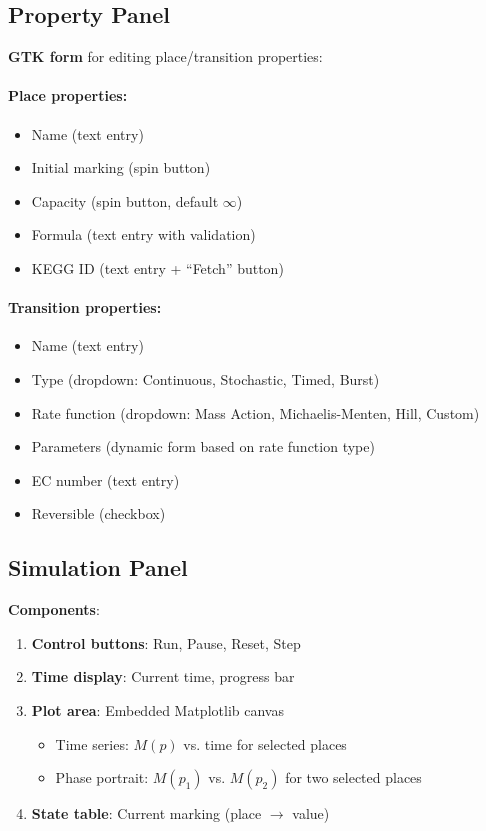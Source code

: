 \subsection{Property Panel}
\label{subsec:property-panel}

\textbf{GTK form} for editing place/transition properties:

\paragraph{Place properties:}
\begin{itemize}
    \item Name (text entry)
    \item Initial marking (spin button)
    \item Capacity (spin button, default $\infty$)
    \item Formula (text entry with validation)
    \item KEGG ID (text entry + ``Fetch'' button)
\end{itemize}

\paragraph{Transition properties:}
\begin{itemize}
    \item Name (text entry)
    \item Type (dropdown: Continuous, Stochastic, Timed, Burst)
    \item Rate function (dropdown: Mass Action, Michaelis-Menten, Hill, Custom)
    \item Parameters (dynamic form based on rate function type)
    \item EC number (text entry)
    \item Reversible (checkbox)
\end{itemize}

\subsection{Simulation Panel}
\label{subsec:simulation-panel}

\textbf{Components}:

\begin{enumerate}
    \item \textbf{Control buttons}: Run, Pause, Reset, Step
    \item \textbf{Time display}: Current time, progress bar
    \item \textbf{Plot area}: Embedded Matplotlib canvas
    \begin{itemize}
        \item Time series: $M(p)$ vs. time for selected places
        \item Phase portrait: $M(p_1)$ vs. $M(p_2)$ for two selected places
    \end{itemize}
    \item \textbf{State table}: Current marking (place $\to$ value)
\end{enumerate}


